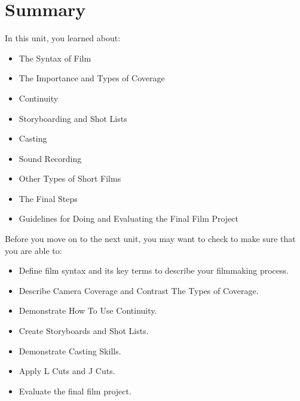 \documentclass[
  letterpaper,
  DIV=11,
  numbers=noendperiod]{scrreprt}
\providecommand{\tightlist}{%
  \setlength{\itemsep}{0pt}\setlength{\parskip}{0pt}}\usepackage{longtable,booktabs,array}
\begin{document}
\section*{Summary}\label{summary-8}


In this unit, you learned about:

\begin{itemize}
\tightlist
\item
  The Syntax of Film
\item
  The Importance and Types of Coverage
\item
  Continuity
\item
  Storyboarding and Shot Lists
\item
  Casting
\item
  Sound Recording
\item
  Other Types of Short Films
\item
  The Final Steps
\item
  Guidelines for Doing and Evaluating the Final Film Project
\end{itemize}

\begin{tcolorbox}[enhanced jigsaw, opacityback=0, colframe=quarto-callout-note-color-frame, leftrule=.75mm, arc=.35mm, rightrule=.15mm, colbacktitle=quarto-callout-note-color!10!white, titlerule=0mm, colback=white, toprule=.15mm, bottomtitle=1mm, breakable, toptitle=1mm, title={Checking Your Learning}, coltitle=black, bottomrule=.15mm, left=2mm, opacitybacktitle=0.6]

Before you move on to the next unit, you may want to check to make sure
that you are able to:

\begin{itemize}
\tightlist
\item
  Define film syntax and its key terms to describe your filmmaking
  process.
\item
  Describe Camera Coverage and Contrast The Types of Coverage.
\item
  Demonstrate How To Use Continuity.
\item
  Create Storyboards and Shot Lists.
\item
  Demonstrate Casting Skills.
\item
  Apply L Cuts and J Cuts.
\item
  Evaluate the final film project.
\end{itemize}

\end{tcolorbox}
\end{document}
